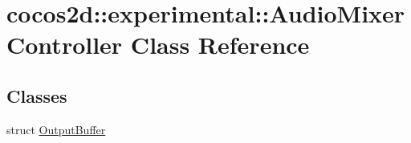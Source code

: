 \hypertarget{classcocos2d_1_1experimental_1_1AudioMixerController}{}\section{cocos2d\+:\+:experimental\+:\+:Audio\+Mixer\+Controller Class Reference}
\label{classcocos2d_1_1experimental_1_1AudioMixerController}
\subsection*{Classes}
\begin{DoxyCompactItemize}
\item 
struct \hyperlink{structcocos2d_1_1experimental_1_1AudioMixerController_1_1OutputBuffer}{Output\+Buffer}
\end{DoxyCompactItemize}
